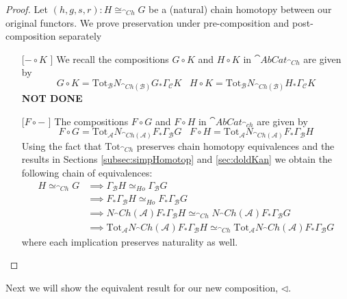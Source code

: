 \begin{proof}
    Let $(h,g,s,r):H\cong_{\cat{Ch}}G$ be a (natural) chain homotopy between our original functors. We prove preservation under pre-composition and post-composition separately
    \begin{itemize}
        \setlength{\itemindent}{2em}
        \item[[$-\circ K$]] We recall the compositions $G\circ K$ and $H\circ K$ in $\cat{AbCat}_{\cat{Ch}}$ are given by
        \begin{equation*}
            G\circ K = \text{Tot}_{\mathcal{B}}N_{\cat{Ch}(\mathcal{B})}G_*\Gamma_\mathcal{C}K\;\;\;H\circ K = \text{Tot}_{\mathcal{B}}N_{\cat{Ch}(\mathcal{B})}H_*\Gamma_\mathcal{C}K
        \end{equation*}
        \textbf{NOT DONE}
        \item[[$F\circ -$]] The compositions $F\circ G$ and $F \circ H$ in $\cat{AbCat}_{\cat{ch}}$ are given by
        \begin{equation*}
            F\circ G = \text{Tot}_{\mathcal{A}}N_{\cat{Ch}(\mathcal{A})}F_*\Gamma_\mathcal{B}G\;\;\;F\circ H = \text{Tot}_{\mathcal{A}}N_{\cat{Ch}(\mathcal{A})}F_*\Gamma_\mathcal{B}H
        \end{equation*}
        Using the fact that $\text{Tot}_{\cat{Ch}}$ preserves chain homotopy equivalences \cite[Remark 12.18.6]{StacksProject} and the results in Sections \ref{subsec:simpHomotop} and \ref{sec:doldKan} we obtain the following chain of equivalences:
        \begin{align*}
            H\simeq_{\cat{Ch}}G &\implies \Gamma_\mathcal{B}H\simeq_{Ho}\Gamma_\mathcal{B}G \\
            &\implies F_*\Gamma_\mathcal{B}H\simeq_{Ho}F_*\Gamma_\mathcal{B}G \\
            &\implies N_\cat{Ch}(\mathcal{A})F_*\Gamma_\mathcal{B}H\simeq_{\cat{Ch}}N_\cat{Ch}(\mathcal{A})F_*\Gamma_\mathcal{B}G \\
            &\implies \text{Tot}_\mathcal{A}N_\cat{Ch}(\mathcal{A})F_*\Gamma_\mathcal{B}H\simeq_{\cat{Ch}}\text{Tot}_\mathcal{A}N_\cat{Ch}(\mathcal{A})F_*\Gamma_\mathcal{B}G 
        \end{align*}
        where each implication preserves naturality as well.
    \end{itemize}
\end{proof}


Next we will show the equivalent result for our new composition, $\lhd$.

